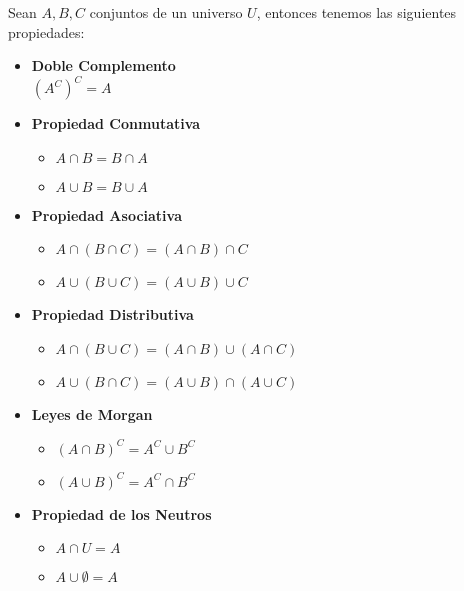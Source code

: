 \documentclass[12pt]{report}                                    %
\begin{document}
            Sean $A, B, C$ conjuntos de un universo $U$, entonces tenemos las siguientes propiedades:

            \begin{itemize}
                \item \textbf{Doble Complemento} \\
                        $(A^C)^C = A$

                \item \textbf{Propiedad Conmutativa}
                    \begin{itemize}
                        \item $A \cap B = B \cap A$
                        \item $A \cup B = B \cup A$
                    \end{itemize}

                \item \textbf{Propiedad Asociativa}
                    \begin{itemize}
                        \item $A \cap (B \cap C) = (A \cap B) \cap C$
                        \item $A \cup (B \cup C) = (A \cup B) \cup C$
                    \end{itemize}

                \item \textbf{Propiedad Distributiva}
                    \begin{itemize}
                        \item $A \cap (B \cup C) = (A \cap B) \cup (A \cap C)$
                        \item $A \cup (B \cap C) = (A \cup B) \cap (A \cup C)$
                    \end{itemize}

                \item \textbf{Leyes de Morgan}
                    \begin{itemize}
                        \item $(A \cap B)^C = A^C \cup B^C$
                        \item $(A \cup B)^C = A^C \cap B^C$
                    \end{itemize}

                \clearpage

                \item \textbf{Propiedad de los Neutros}
                    \begin{itemize}
                        \item $A \cap U = A$
                        \item $A \cup \emptyset = A$
                    \end{itemize}


\end{itemize}
\end{document}
